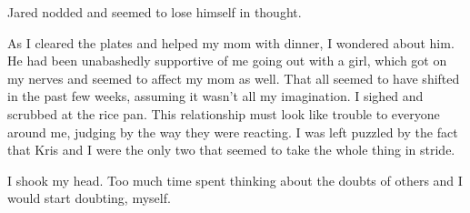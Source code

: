 Jared nodded and seemed to lose himself in thought.

As I cleared the plates and helped my mom with dinner, I wondered about him.  He had been unabashedly supportive of me going out with a girl, which got on my nerves and seemed to affect my mom as well.  That all seemed to have shifted in the past few weeks, assuming it wasn't all my imagination.  I sighed and scrubbed at the rice pan.  This relationship must look like trouble to everyone around me, judging by the way they were reacting.  I was left puzzled by the fact that Kris and I were the only two that seemed to take the whole thing in stride. 

I shook my head.  Too much time spent thinking about the doubts of others and I would start doubting, myself.
